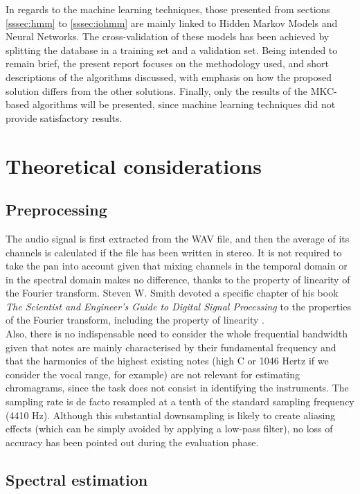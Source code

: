 \documentclass[letterpaper]{article}
\begin{document}
In regards to the machine learning techniques, those presented from sections \ref{sssec:hmm} to \ref{sssec:iohmm}
are mainly linked to Hidden Markov Models and Neural Networks. The cross-validation of these models has been achieved by splitting
the database in a training set and a validation set. Being intended to remain brief, the present report focuses on the methodology used,
and short descriptions of the algorithms discussed, with emphasis on how the proposed solution differs from the other solutions. Finally, only the results of the MKC-based algorithms will be presented, since machine learning techniques did not provide satisfactory results.

\section{Theoretical considerations}

\subsection{Preprocessing}

The audio signal is first extracted from the WAV file, and then the average of its channels is calculated
if the file has been written in stereo. It is not required to take the pan into account given that mixing
channels in the temporal domain or in the spectral domain makes no difference, thanks to the property of linearity of the Fourier transform.
Steven W. Smith devoted a specific chapter of his book \textit{The Scientist and Engineer's Guide to Digital Signal Processing} to the properties of the Fourier transform, including the property of linearity \citep{PHD}. \\

Also, there is no indispensable need to consider the whole frequential bandwidth given that notes are mainly characterised 
by their fundamental frequency
and that the harmonics of the highest existing notes (high C or 1046 Hertz if we consider the vocal range, for example) are not relevant for estimating chromagrams, since the task does not consist in identifying the instruments.
The sampling rate is de facto resampled at a tenth of the standard sampling frequency (4410 Hz).
Although this substantial downsampling is likely to create aliasing effects (which can be simply avoided by 
applying a low-pass filter), no loss of accuracy has been pointed out during the evaluation phase.

\subsection{Spectral estimation}
\end{document}
